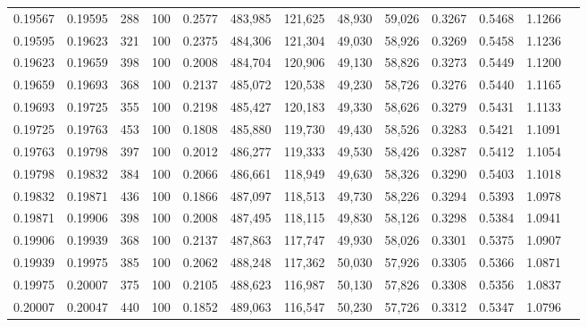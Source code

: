 \begin{tabular}{rrrrrrrrrrrrr}
0.19567 & 0.19595 &   288 & 100 &                                     0.2577 & 483,985 & 121,625 &  48,930 &  59,026 & 0.3267 & 0.5468 & 1.1266 \\
0.19595 & 0.19623 &   321 & 100 &                                     0.2375 & 484,306 & 121,304 &  49,030 &  58,926 & 0.3269 & 0.5458 & 1.1236 \\
0.19623 & 0.19659 &   398 & 100 &                                     0.2008 & 484,704 & 120,906 &  49,130 &  58,826 & 0.3273 & 0.5449 & 1.1200 \\
0.19659 & 0.19693 &   368 & 100 &                                     0.2137 & 485,072 & 120,538 &  49,230 &  58,726 & 0.3276 & 0.5440 & 1.1165 \\
0.19693 & 0.19725 &   355 & 100 &                                     0.2198 & 485,427 & 120,183 &  49,330 &  58,626 & 0.3279 & 0.5431 & 1.1133 \\
0.19725 & 0.19763 &   453 & 100 &                                     0.1808 & 485,880 & 119,730 &  49,430 &  58,526 & 0.3283 & 0.5421 & 1.1091 \\
0.19763 & 0.19798 &   397 & 100 &                                     0.2012 & 486,277 & 119,333 &  49,530 &  58,426 & 0.3287 & 0.5412 & 1.1054 \\
0.19798 & 0.19832 &   384 & 100 &                                     0.2066 & 486,661 & 118,949 &  49,630 &  58,326 & 0.3290 & 0.5403 & 1.1018 \\
0.19832 & 0.19871 &   436 & 100 &                                     0.1866 & 487,097 & 118,513 &  49,730 &  58,226 & 0.3294 & 0.5393 & 1.0978 \\
0.19871 & 0.19906 &   398 & 100 &                                     0.2008 & 487,495 & 118,115 &  49,830 &  58,126 & 0.3298 & 0.5384 & 1.0941 \\
0.19906 & 0.19939 &   368 & 100 &                                     0.2137 & 487,863 & 117,747 &  49,930 &  58,026 & 0.3301 & 0.5375 & 1.0907 \\
0.19939 & 0.19975 &   385 & 100 &                                     0.2062 & 488,248 & 117,362 &  50,030 &  57,926 & 0.3305 & 0.5366 & 1.0871 \\
0.19975 & 0.20007 &   375 & 100 &                                     0.2105 & 488,623 & 116,987 &  50,130 &  57,826 & 0.3308 & 0.5356 & 1.0837 \\
0.20007 & 0.20047 &   440 & 100 &                                     0.1852 & 489,063 & 116,547 &  50,230 &  57,726 & 0.3312 & 0.5347 & 1.0796 \\

\end{tabular}
